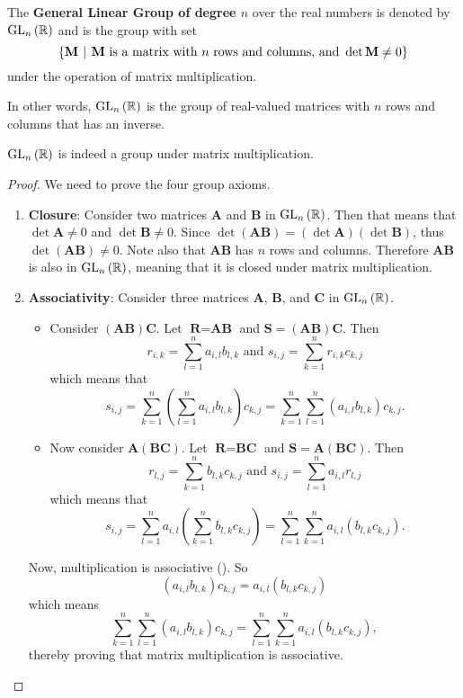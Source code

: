 \begin{definition}
    The \textbf{General Linear Group of degree $n$} over the real numbers is denoted by $\mathrm{GL}_{n}\left(\mathbb{R}\right)$ and is the group with set
    \[
        \left\{\textbf{M} \vert \text{\textbf{M} is a matrix with } n \text{ rows and columns, and } \det \textbf{M} \neq 0\right\}
    \]
    under the operation of matrix multiplication.
\end{definition}
In other words, $\mathrm{GL}_{n}\left(\mathbb{R}\right)$ is the group of real-valued matrices with $n$ rows and columns that has an inverse.

\begin{proposition}
    $\mathrm{GL}_{n}\left(\mathbb{R}\right)$ is indeed a group under matrix multiplication.
\end{proposition}
\begin{proof}
    We need to prove the four group axioms.
    \begin{enumerate}
        \item \textbf{Closure}: Consider two matrices \textbf{A} and \textbf{B} in $\mathrm{GL}_{n}\left(\mathbb{R}\right)$. Then that means that $\det \textbf{A} \neq 0$ and $\det \textbf{B} \neq 0$. Since $\det(\textbf{AB}) = (\det \textbf{A})(\det \textbf{B})$, thus $\det(\textbf{AB}) \neq 0$. Note also that $\textbf{AB}$ has $n$ rows and columns. Therefore $\textbf{AB}$ is also in $\mathrm{GL}_{n}\left(\mathbb{R}\right)$, meaning that it is closed under matrix multiplication.

        \item \textbf{Associativity}: Consider three matrices \textbf{A}, \textbf{B}, and \textbf{C} in $\mathrm{GL}_{n}\left(\mathbb{R}\right)$.
        \begin{itemize}
            \item Consider $(\textbf{AB})\textbf{C}$. Let $\textbf{R} = \textbf{AB}$ and $\textbf{S} = (\textbf{AB})\textbf{C}$. Then
            \[
                r_{i,k} = \sum_{l=1}^n a_{i,l}b_{l,k} \text{ and } s_{i,j} = \sum_{k=1}^n r_{i,k}c_{k,j}
            \]
            which means that
            \[
                s_{i,j} = \sum_{k=1}^n \left(\sum_{l=1}^n a_{i,l}b_{l,k}\right)c_{k,j} = \sum_{k=1}^n \sum_{l=1}^n (a_{i,l}b_{l,k})c_{k,j}.
            \]
            \item Now consider $\textbf{A}(\textbf{BC})$. Let $\textbf{R} = \textbf{BC}$ and $\textbf{S} = \textbf{A}(\textbf{BC})$. Then
            \[
                r_{l,j} = \sum_{k=1}^nb_{l,k}c_{k,j} \text{ and } s_{i,j} = \sum_{l=1}^n a_{i,l}r_{l,j}
            \]
            which means that
            \[
                s_{i,j} = \sum_{l=1}^n a_{i,l}\left(\sum_{k=1}^nb_{l,k}c_{k,j}\right) = \sum_{l=1}^n\sum_{k=1}^n a_{i,l}(b_{l,k}c_{k,j}).
            \]
        \end{itemize}
        Now, multiplication is associative (). So
        \[
                (a_{i,l}b_{l,k})c_{k,j} = a_{i,l}(b_{l,k}c_{k,j})
        \]
        which means
        \[
            \sum_{k=1}^n \sum_{l=1}^n (a_{i,l}b_{l,k})c_{k,j} = \sum_{l=1}^n\sum_{k=1}^n a_{i,l}(b_{l,k}c_{k,j}),
        \]
        thereby proving that matrix multiplication is associative.


\end{enumerate}
\end{proof}
